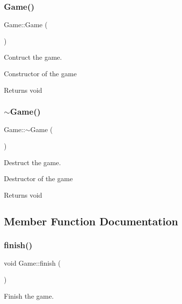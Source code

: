 \subsubsection{\texorpdfstring{Game()}{Game()}}
{\footnotesize\ttfamily Game\+::\+Game (\begin{DoxyParamCaption}{ }\end{DoxyParamCaption})}



Contruct the game. 

Constructor of the game

\begin{DoxyReturn}{Returns}
void 
\end{DoxyReturn}
\mbox{\label{class_game_ae3d112ca6e0e55150d2fdbc704474530}} 
\subsubsection{\texorpdfstring{$\sim$\+Game()}{~Game()}}
{\footnotesize\ttfamily Game\+::$\sim$\+Game (\begin{DoxyParamCaption}{ }\end{DoxyParamCaption})}



Destruct the game. 

Destructor of the game

\begin{DoxyReturn}{Returns}
void 
\end{DoxyReturn}


\subsection{Member Function Documentation}
\mbox{\label{class_game_a4a803542276ea0497ad3a87b8983dd67}} 
\subsubsection{\texorpdfstring{finish()}{finish()}}
{\footnotesize\ttfamily void Game\+::finish (\begin{DoxyParamCaption}{ }\end{DoxyParamCaption})}



Finish the game. 

